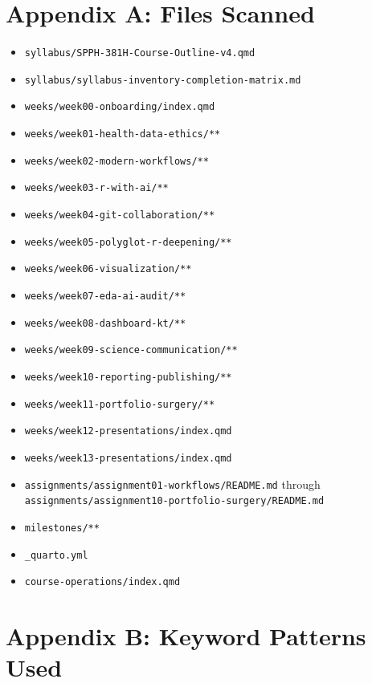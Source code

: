 \documentclass[
  letterpaper,
  DIV=11,
  numbers=noendperiod,
  oneside]{scrreprt}
\providecommand{\tightlist}{%
  \setlength{\itemsep}{0pt}\setlength{\parskip}{0pt}}
\begin{document}
\section{Appendix A: Files Scanned}\label{appendix-a-files-scanned}

\begin{itemize}
\tightlist
\item
  \texttt{syllabus/SPPH-381H-Course-Outline-v4.qmd}
\item
  \texttt{syllabus/syllabus-inventory-completion-matrix.md}
\item
  \texttt{weeks/week00-onboarding/index.qmd}
\item
  \texttt{weeks/week01-health-data-ethics/**}
\item
  \texttt{weeks/week02-modern-workflows/**}
\item
  \texttt{weeks/week03-r-with-ai/**}
\item
  \texttt{weeks/week04-git-collaboration/**}
\item
  \texttt{weeks/week05-polyglot-r-deepening/**}
\item
  \texttt{weeks/week06-visualization/**}
\item
  \texttt{weeks/week07-eda-ai-audit/**}
\item
  \texttt{weeks/week08-dashboard-kt/**}
\item
  \texttt{weeks/week09-science-communication/**}
\item
  \texttt{weeks/week10-reporting-publishing/**}
\item
  \texttt{weeks/week11-portfolio-surgery/**}
\item
  \texttt{weeks/week12-presentations/index.qmd}
\item
  \texttt{weeks/week13-presentations/index.qmd}
\item
  \texttt{assignments/assignment01-workflows/README.md} through
  \texttt{assignments/assignment10-portfolio-surgery/README.md}
\item
  \texttt{milestones/**}
\item
  \texttt{\_quarto.yml}
\item
  \texttt{course-operations/index.qmd}
\end{itemize}

\section{Appendix B: Keyword Patterns
Used}\label{appendix-b-keyword-patterns-used}
\end{document}
